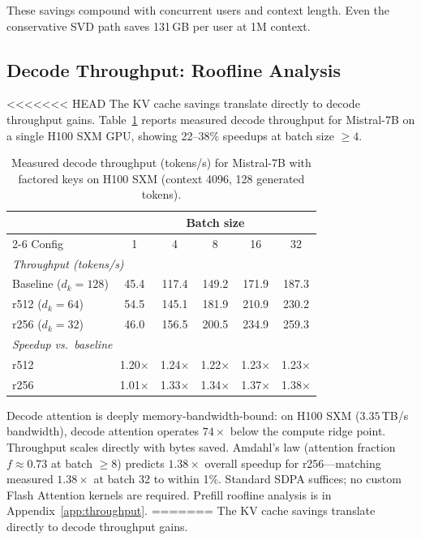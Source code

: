 \documentclass{article} %
\begin{document}
These savings compound with concurrent users and context length. Even the conservative SVD path saves 131\,GB per user at 1M context.


\subsection{Decode Throughput: Roofline Analysis}\label{sec:decode_throughput}

<<<<<<< HEAD
The KV cache savings translate directly to decode throughput gains. Table~\ref{tab:decode_throughput} reports measured decode throughput for Mistral-7B on a single H100 SXM GPU, showing 22--38\% speedups at batch size $\geq 4$.

\begin{table}[h]
\centering
\caption{Measured decode throughput (tokens/s) for Mistral-7B with factored keys on H100 SXM (context 4096, 128 generated tokens).}
\label{tab:decode_throughput}
\small
\begin{tabular}{lccccc}
\toprule
 & \multicolumn{5}{c}{Batch size} \\
\cmidrule(lr){2-6}
Config & 1 & 4 & 8 & 16 & 32 \\
\midrule
\multicolumn{6}{l}{\emph{Throughput (tokens/s)}} \\
\quad Baseline ($d_k\!=\!128$) & 45.4 & 117.4 & 149.2 & 171.9 & 187.3 \\
\quad r512 ($d_k\!=\!64$)      & 54.5 & 145.1 & 181.9 & 210.9 & 230.2 \\
\quad r256 ($d_k\!=\!32$)      & 46.0 & 156.5 & 200.5 & 234.9 & 259.3 \\
\midrule
\multicolumn{6}{l}{\emph{Speedup vs.\ baseline}} \\
\quad r512 & 1.20$\times$ & 1.24$\times$ & 1.22$\times$ & 1.23$\times$ & 1.23$\times$ \\
\quad r256 & 1.01$\times$ & 1.33$\times$ & 1.34$\times$ & 1.37$\times$ & 1.38$\times$ \\
\bottomrule
\end{tabular}
\end{table}

Decode attention is deeply memory-bandwidth-bound: on H100 SXM ($3.35$\,TB/s bandwidth), decode attention operates $74\times$ below the compute ridge point. Throughput scales directly with bytes saved. Amdahl's law (attention fraction $f \approx 0.73$ at batch $\geq 8$) predicts $1.38\times$ overall speedup for r256---matching measured $1.38\times$ at batch 32 to within 1\%. Standard SDPA suffices; no custom Flash Attention kernels are required. Prefill roofline analysis is in Appendix~\ref{app:throughput}.
=======
The KV cache savings translate directly to decode throughput gains.
\end{document}
